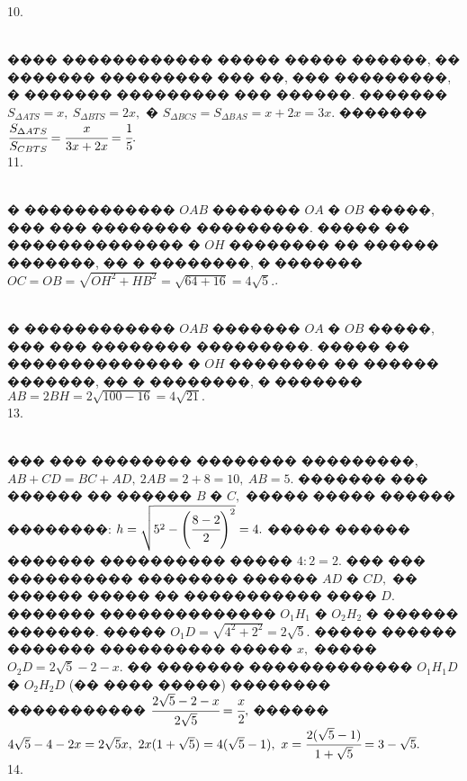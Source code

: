 \documentclass[12pt]{article}
\begin{document}
10. \begin{figure}[ht!]
\end{figure}\\
���� ������������ ����� ����� ������, �� ������� ��������� ��� ��, ��� ���������, � ������� ��������� ��� ������. ������� $S_{\Delta ATS}=x,\ S_{\Delta BTS}=2x,$ � $S_{\Delta BCS}=S_{\Delta BAS}=x+2x=3x.$ ������� $\cfrac{S_{\Delta ATS}}{S_{CBTS}}=\cfrac{x}{3x+2x}=\cfrac{1}{5}.$\\
11. \begin{figure}[ht!]
\end{figure}\\
� ������������ $OAB$ ������� $OA$ � $OB$ �����, ��� ��� �������� ���������. ����� �� �������������� � $OH$ �������� �� ������ �������, �� � ��������, � ������� $OC=OB=\sqrt{OH^2+HB^2}=\sqrt{64+16}=4\sqrt{5}.$\newpage{}. \begin{figure}[ht!]
\end{figure}\\
� ������������ $OAB$ ������� $OA$ � $OB$ �����, ��� ��� �������� ���������. ����� �� �������������� � $OH$ �������� �� ������ �������, �� � ��������, � ������� $AB=2BH=2\sqrt{100-16}=4\sqrt{21}.$\\
13. \begin{figure}[ht!]
\end{figure}\\
��� ��� �������� �������� ���������, $AB+CD=BC+AD,\ 2AB=2+8=10,\ AB=5.$ ������� ��� ������ �� ������ $B$ � $C,$ ����� ����� ������ ��������: $h=\sqrt{5^2-\left(\cfrac{8-2}{2}\right)^2}=4.$ ����� ������ ������� ���������� ����� $4:2=2.$ ��� ��� ���������� �������� ������ $AD$ � $CD,$ �� ������ ����� �� ����������� ���� $D.$ ������� �������������� $O_1H_1$ � $O_2H_2$ � ������ �������. ����� $O_1D=\sqrt{4^2+2^2}=2\sqrt{5}.$ ����� ������ ������� ���������� ����� $x,$ �����  $O_2D=2\sqrt{5}-2-x.$ �� ������� ������������� $O_1H_1D$ � $O_2H_2D$ (�� ���� �����) �������� ����������� $\cfrac{2\sqrt{5}-2-x }{2\sqrt{5}}=\cfrac{x}{2},$ ������ $4\sqrt{5}-4-2x=2\sqrt{5}x,\ 2x(1+\sqrt{5})=4(\sqrt{5}-1),\ x=\cfrac{2(\sqrt{5}-1)}{1+\sqrt{5}}=3-\sqrt{5}.$\\
14. \begin{figure}[ht!]
\end{figure}\\
\end{document}
